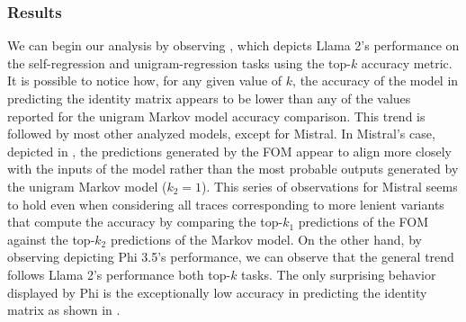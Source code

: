 \subsubsection{Results}

\begin{figure}[t!]
    \centering
    \quad
    \quad
    \caption{}
    \label{fig:exp_fom_1_A}
\end{figure}

We can begin our analysis by observing , which depicts Llama 2's performance on the self-regression and unigram-regression tasks using the top-$k$ accuracy metric.
It is possible to notice how, for any given value of $k$, the accuracy of the model in predicting the identity matrix appears to be lower than any of the values reported for the unigram Markov model accuracy comparison.
This trend is followed by most other analyzed models, except for Mistral.
In Mistral's case, depicted in , the predictions generated by the FOM appear to align more closely with the inputs of the model rather than the most probable outputs generated by the unigram Markov model ($k_2 = 1$).
This series of observations for Mistral seems to hold even when considering all traces corresponding to more lenient variants that compute the accuracy by comparing the top-$k_1$ predictions of the FOM against the top-$k_2$ predictions of the Markov model.
On the other hand, by observing  depicting Phi 3.5's performance, we can observe that the general trend follows Llama 2's performance  both top-$k$ tasks.
The only surprising behavior displayed by Phi is the exceptionally low accuracy in predicting the identity matrix as shown in .

